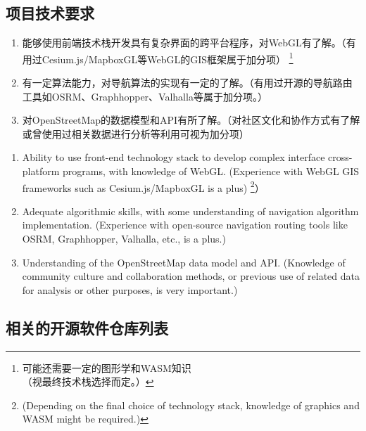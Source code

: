 \documentclass{beamer}
\begin{document}
\subsection{项目技术要求}

\begin{frame}
    \begin{enumerate}
        \item 能够使用前端技术栈开发具有复杂界面的跨平台程序，对WebGL有了解。（有用过Cesium.js/MapboxGL等WebGL的GIS框架属于加分项）
        \footnote{可能还需要一定的图形学和WASM知识\\（视最终技术栈选择而定。）}
        \item 有一定算法能力，对导航算法的实现有一定的了解。（有用过开源的导航路由工具如OSRM、Graphhopper、Valhalla等属于加分项。）
        \item 对OpenStreetMap的数据模型和API有所了解。（对社区文化和协作方式有了解或曾使用过相关数据进行分析等利用可视为加分项）
    \end{enumerate}
\end{frame}

\begin{frame}
    \begin{enumerate}
        \item Ability to use front-end technology stack to develop complex interface cross-platform programs, with knowledge of WebGL. (Experience with WebGL GIS frameworks such as Cesium.js/MapboxGL is a plus)
        \footnote{(Depending on the final choice of technology stack, knowledge of graphics and WASM might be required.)}）
        \item Adequate algorithmic skills, with some understanding of navigation algorithm implementation. (Experience with open-source navigation routing tools like OSRM, Graphhopper, Valhalla, etc., is a plus.)
        \item Understanding of the OpenStreetMap data model and API. (Knowledge of community culture and collaboration methods, or previous use of related data for analysis or other purposes, is very important.)
    \end{enumerate}
\end{frame}


\subsection{相关的开源软件仓库列表}
\end{document}
